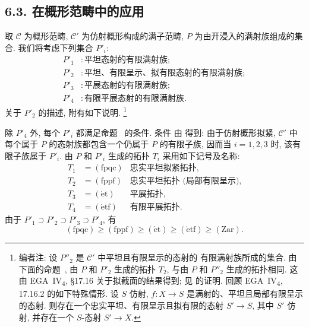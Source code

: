 \subsection*{6.3. 在概形范畴中的应用}

取 \(\mathscr C\) 为概形范畴, \(\mathscr C'\) 为仿射概形构成的满子范畴,
\(P\) 为由开浸入的满射族组成的集合. 我们将考虑下列集合 \(P'_i\):
\begin{align*}
 P'_1 &: \text{平坦态射的有限满射族};\\
 P'_2 &: \text{平坦、有限呈示、拟有限态射的有限满射族};\\
 P'_3 &: \text{平展态射的有限满射族};\\
 P'_4 &: \text{有限平展态射的有限满射族}.
\end{align*}
关于 \(P'_2\) 的描述, 附有如下说明.
\footnote{编者注: 设 \(P''_2\) 是 \(\mathscr C'\) 中平坦且有限呈示的态射的
有限满射族所成的集合. 由下面的命题~,
由 \(P\) 和 \(P'_2\) 生成的拓扑 \(T_2\), 与由 \(P\) 和 \(P''_2\)
生成的拓扑相同. 这由 EGA~IV\textsubscript{4}, \S17.16 关于拟截面的结果得到;
见  的证明.
回顾 EGA~IV\textsubscript{4}, 17.16.2 的如下特殊情形.
设 \(S\) 仿射, \(f:X\to S\) 是满射的、平坦且局部有限呈示的态射.
则存在一个忠实平坦、有限呈示且拟有限的态射 \(S'\to S\),
其中 \(S'\) 仿射, 并存在一个 \(S\)-态射 \(S'\to X\).}

除 \(P'_4\) 外, 每个 \(P'_i\) 都满足命题~
的条件. 条件  由
 得到:
由于仿射概形拟紧, \(\mathscr C'\) 中每个属于 \(P\) 的态射族都包含一个仍属于
\(P\) 的有限子族, 因而当 \(i=1,2,3\) 时, 该有限子族属于 \(P'_i\).
由 \(P\) 和 \(P'_i\) 生成的拓扑 \(T_i\) 采用如下记号及名称:
\footnotemark[\value{footnote}]
\[
\begin{array}{ccl}
 T_1&=(\mathrm{fpqc})&
   \text{忠实平坦拟紧拓扑},\\
 T_2&=(\mathrm{fppf})&
   \text{忠实平坦拓扑 (局部有限呈示)},\\
 T_3&=(\mathrm{\acute et})&
   \text{平展拓扑},\\
 T_4&=(\mathrm{\acute etf})&
   \text{有限平展拓扑}.
\end{array}
\]
由于 \(P'_1\supset P'_2\supset P'_3\supset P'_4\), 有
\[
  (\mathrm{fpqc})\geq(\mathrm{fppf})\geq(\mathrm{\acute et})
  \geq(\mathrm{\acute etf})\geq(\mathrm{Zar}).
\]

